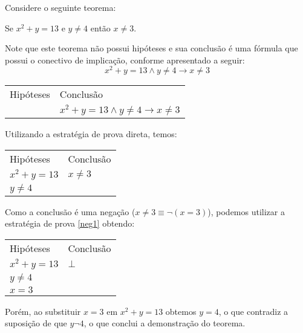 \begin{Example}\label{exneg}
Considere o seguinte teorema:
\begin{flushleft}
Se $x^2+y = 13$ e $y \neq 4$ então $x \neq 3$.
\end{flushleft}
Note que este teorema não possui hipóteses e sua conclusão é uma
fórmula que possui o conectivo de implicação, conforme apresentado a
seguir:
\[
x^2 + y = 13 \land y \neq 4 \to x \neq 3
\]
\begin{flushleft}
\begin{tabular}{ll}
Hipóteses & Conclusão \\
     & $x^2 + y = 13 \land y \neq 4 \to x \neq 3$\\
\end{tabular}
\end{flushleft}
Utilizando a estratégia de prova direta, temos:
\begin{flushleft}
\begin{tabular}{ll}
Hipóteses & Conclusão \\
    $x^2 + y = 13$ & $x \neq 3$\\
   $y \neq 4$ & \\
\end{tabular}
\end{flushleft}
Como a conclusão é uma negação ($x \neq 3 \equiv \neg (x = 3)$),
podemos utilizar a estratégia de prova \ref{neg1} obtendo:
\begin{flushleft}
\begin{tabular}{ll}
Hipóteses & Conclusão \\
    $x^2 + y = 13$ & $\bot$\\
   $y \neq 4$ & \\
   $x = 3$ &
\end{tabular}
\end{flushleft}
Porém, ao substituir $x = 3$ em $x^2 + y = 13$ obtemos $y = 4$, o que
contradiz a suposição de que $y \neg 4$, o que conclui a demonstração
do teorema.


\end{Example}
